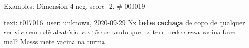 \begin{frame}{Examples: Dimension 4 neg, score -2, \# 000019}
\footnotesize
\begin{alertblock}{text: t017016, user: unknown, 2020-09-29}
Nx \textbf{bebe} \textbf{cachaça} de copo de qualquer ser vivo em rolê 
aleatório vcs tão achando que nx tem medo dessa vacina fazer mal? Mosss mete 
vacina na turma 
\end{alertblock}
\end{frame}

